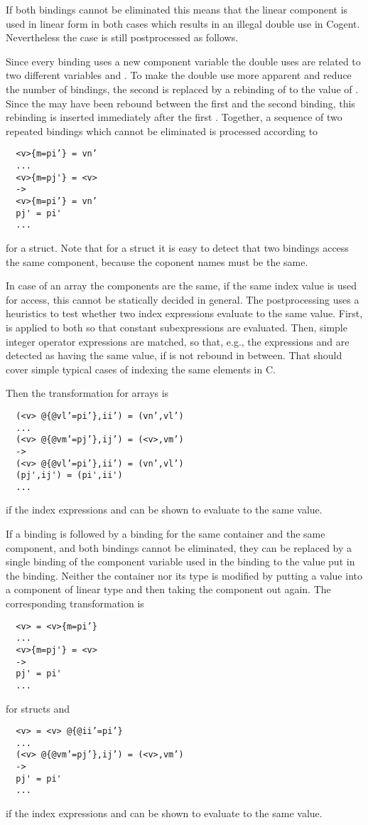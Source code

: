 If both  bindings cannot be eliminated this means that the linear component is used in linear form in both cases
which results in an illegal double use in Cogent. Nevertheless the case is still postprocessed as follows.

Since every  binding uses a new component variable  the double uses are related to two different variables 
 and . To make the double use more apparent and reduce the
number of  bindings, the second  is replaced by a rebinding of  to the value of . Since 
the  may have been rebound between the first and the second  binding, this rebinding is inserted immediately
after the first . Together, a sequence of two repeated  bindings which cannot be eliminated is processed 
according to
\begin{verbatim}
  <v>{m=pi’} = vn’
  ...
  <v>{m=pj'} = <v>
  ->
  <v>{m=pi’} = vn’
  pj' = pi'
  ...
\end{verbatim}
for a struct. Note that for a struct it is easy to detect that two  bindings access the same component, because the coponent
names must be the same. 

In case of an array the components are the same, if the same index value is used for access, this cannot be 
statically decided in general. The postprocessing uses a heuristics to test whether two index expressions evaluate to the same
value. First,  is applied to both so that constant subexpressions are evaluated. Then, simple integer operator
expressions are matched, so that, e.g., the expressions  and  are detected as having the same value, 
if  is not rebound in between. That should cover simple typical cases of indexing the same elements in C.

Then the transformation for arrays is
\begin{verbatim}
  (<v> @{@vl’=pi’},ii’) = (vn’,vl’)
  ...
  (<v> @{@vm’=pj’},ij’) = (<v>,vm’)
  ->
  (<v> @{@vl’=pi’},ii’) = (vn’,vl’)
  (pj',ij') = (pi',ii')
  ...
\end{verbatim}
if the index expressions  and  can be shown to evaluate to the same value.

If a  binding is followed by a  binding for the same container and the same component, and both bindings cannot
be eliminated, they can be replaced by a single binding of the component variable used in the  binding to the value 
put in the  binding. Neither the container nor its type is modified by putting a value into a component of linear type and then
taking the component out again. The corresponding transformation is
\begin{verbatim}
  <v> = <v>{m=pi’}
  ...
  <v>{m=pj'} = <v>
  ->
  pj' = pi'
  ...
\end{verbatim}
for structs and
\begin{verbatim}
  <v> = <v> @{@ii’=pi’}
  ...
  (<v> @{@vm’=pj’},ij’) = (<v>,vm’)
  ->
  pj' = pi'
  ...
\end{verbatim}
if the index expressions  and  can be shown to evaluate to the same value.

